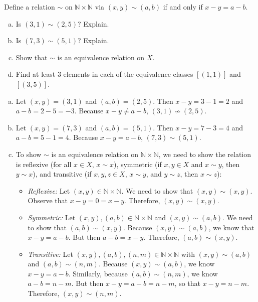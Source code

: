 \documentclass[11pt,letterpaper]{article}
\begin{document}

 Define a relation $\sim$ on $\mathbb{N} \times \mathbb{N}$ via $(x, y) \sim (a, b)$ if and only if $x - y= a - b$.  
        \begin{enumerate}[(a)]
        \item Is $(3, 1) \sim (2, 5)$? Explain.
        \item Is $(7, 3) \sim (5, 1)$? Explain. 
        \item Show that $\sim$ is an equivalence relation on $X$.
        \item Find at least 3 elements in each of the equivalence classes $[(1, 1)]$ and $[(3, 5)]$. 
        \end{enumerate} 

\sol 
\begin{enumerate}[(a)]
\item Let $(x, y)= (3, 1)$ and $(a, b)= (2, 5)$. Then $x - y= 3 - 1= 2$ and $a - b= 2 - 5= -3$. Because $x - y \neq a - b$, $(3, 1) \not\sim (2, 5)$. 

\item Let $(x, y)= (7, 3)$ and $(a, b)= (5, 1)$. Then $x - y= 7 - 3= 4$ and $a - b= 5 - 1= 4$. Because $x - y= a - b$, $(7, 3) \sim (5, 1)$. 

\item To show $\sim$ is an equivalence relation on $\mathbb{N} \times \mathbb{N}$, we need to show the relation is reflexive (for all $x \in X$, $x \sim x$), symmetric (if $x, y \in X$ and $x \sim y$, then $y \sim x$), and transitive (if $x, y, z \in X$, $x \sim y$, and $y \sim z$, then $x \sim z$):
	\begin{itemize}
	\item \textit{Reflexive:} Let $(x, y) \in \mathbb{N} \times \mathbb{N}$. We need to show that $(x, y) \sim (x, y)$. Observe that $x - y= 0= x - y$. Therefore, $(x, y) \sim (x, y)$. 
	
	\item \textit{Symmetric:} Let $(x, y), (a, b) \in \mathbb{N} \times \mathbb{N}$ and $(x, y) \sim (a, b)$. We need to show that $(a, b) \sim (x, y)$. Because $(x, y) \sim (a, b)$, we know that $x - y= a - b$. But then $a - b= x - y$. Therefore, $(a, b) \sim (x, y)$. 
	
	\item \textit{Transitive:} Let $(x, y), (a, b), (n, m) \in \mathbb{N} \times \mathbb{N}$ with $(x, y) \sim (a, b)$ and $(a, b) \sim (n, m)$. Because $(x, y) \sim (a, b)$, we know $x - y= a - b$. Similarly, because $(a, b) \sim (n, m)$, we know $a - b= n - m$. But then $x - y= a - b= n - m$, so that $x - y= n - m$. Therefore, $(x, y) \sim (n, m)$. 
	\end{itemize} \pspace


\end{enumerate}
\end{document}
